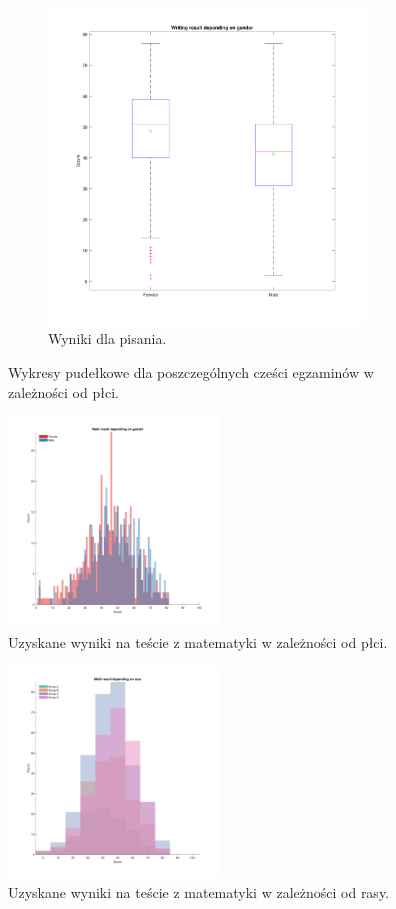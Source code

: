 \documentclass[12pt]{article}
\begin{document}
\begin{figure}[H]
\begin{subfigure}[t]{0.48\textwidth} 
\centering
\includegraphics[height=3.3in]{writing_score_per_gender.pdf}
\caption{Wyniki dla pisania.}
\end{subfigure}

\caption{Wykresy pudełkowe dla poszczególnych cześci egzaminów w zależności od płci.} \label{fig:box_genders}
\end{figure}



\begin{figure}[H]
\centering
\includegraphics[width=0.5\textwidth]{hist_math_score_per_gender.pdf}
\caption{Uzyskane wyniki na teście z matematyki w zależności od płci.}
\end{figure}

\begin{figure}[H]
\centering
\includegraphics[width=0.5\textwidth]{hist_math_score_per_race.pdf}
\caption{Uzyskane wyniki na teście z matematyki w zależności od rasy.}
\end{figure}
\end{document}
